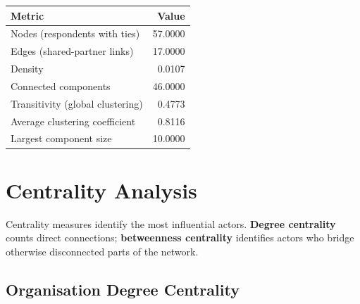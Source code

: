 \documentclass[
  letterpaper,
  DIV=11,
  numbers=noendperiod]{scrartcl}
\begin{document}
\begin{longtable*}[t]{lr}
\toprule
Metric & Value\\
\midrule
Nodes (respondents with ties) & 57.0000\\
Edges (shared-partner links) & 17.0000\\
Density & 0.0107\\
Connected components & 46.0000\\
Transitivity (global clustering) & 0.4773\\
\addlinespace
Average clustering coefficient & 0.8116\\
Largest component size & 10.0000\\
\bottomrule
\end{longtable*}

\section{Centrality Analysis}\label{centrality-analysis}

Centrality measures identify the most influential actors. \textbf{Degree
centrality} counts direct connections; \textbf{betweenness centrality}
identifies actors who bridge otherwise disconnected parts of the
network.

\subsection{Organisation Degree
Centrality}\label{organisation-degree-centrality}
\end{document}
